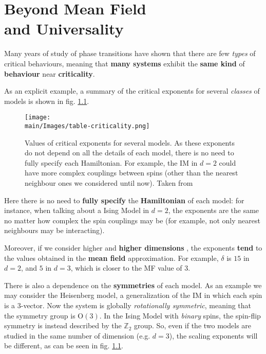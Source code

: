 \documentclass[../../main.tex]{subfiles}
\begin{document}

\chapter{Beyond Mean Field\\ and Universality}
Many years of study of phase transitions have shown that there are few \textit{types} of critical behaviours, meaning that \textbf{many systems} exhibit the \textbf{same kind} of \textbf{behaviour} near \textbf{criticality}.

\medskip

As an explicit example, a summary of the critical exponents for several \textit{classes} of models is shown in fig. \ref{fig:table-criticality}. 

\begin{figure}[H]
    \centering
    \texttt{[image: \\main/Images/table-criticality.png]}
    \caption{Values of critical exponents for several models. As these exponents do not depend on all the details of each model, there is no need to fully specify each Hamiltonian. For example, the IM in $d=2$ could have more complex couplings between spins (other than the nearest neighbour ones we considered until now). Taken from \cite{renormalization}}
    \label{fig:table-criticality}
\end{figure}

Here there is no need to \textbf{fully specify} the \textbf{Hamiltonian} of each model: for instance, when talking about a Ising Model in $d=2$, the exponents are the same no matter how complex the spin couplings may be (for example, not only nearest neighbours may be interacting).

Moreover, if we consider higher and \textbf{higher dimensions} , the exponents \textbf{tend} to the values obtained in the \textbf{mean field} approximation. For example, $\delta$ is $15$ in $d=2$, and $5$ in $d=3$, which is closer to the MF value of $3$.

There is also a dependence on the \textbf{symmetries} of each model. As an example we may consider the Heisenberg model, a generalization of the IM in which each spin is a $3$-vector. Now the system is globally \textit{rotationally symmetric}, meaning that the symmetry group is $\mathrm{O}(3)$. In the Ising Model with \textit{binary} spins, the spin-flip symmetry is instead described by the $\mathbb{Z}_2$ group. So, even if the two models are studied in the same number of dimension (e.g. $d=3$), the scaling exponents will be different, as can be seen in fig. \ref{fig:table-criticality}. 
\end{document}
